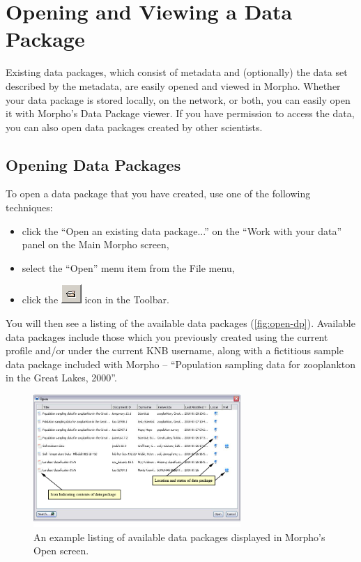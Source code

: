 \section{Opening and Viewing a Data Package} \label{sec:viewing}

Existing data packages, which consist of metadata and (optionally) the
data set described by the metadata, are easily opened and viewed in
Morpho. Whether your data package is stored locally, on the network, or
both, you can easily open it with Morpho's Data Package viewer. If you
have permission to access the data, you can also open data packages
created by other scientists. 

\subsection{Opening Data Packages}

To open a data package that you have created, use one of the following
techniques:

\begin{itemize}
  \setlength{\parskip}{1pt}
  \item click the ``Open an existing data package...'' on the ``Work
    with your data'' panel on the Main Morpho screen,
  \item select the ``Open'' menu item from the File menu,
  \item click the \includegraphics[scale=0.7]{images/button-open.png}
  icon in the Toolbar.
\end{itemize}

You will then see a listing of the available data packages
(\autoref{fig:open-dp}). Available data packages include those which you
previously created using the current profile and/or under the current
KNB username, along with a fictitious sample data package included with
Morpho -- ``Population sampling data for zooplankton in the Great Lakes,
2000''.

\begin{figure}
  \centering
    \includegraphics[width=0.7\textwidth]{images/open-dp.jpg}
  \caption{An example listing of available data packages displayed in
    Morpho's Open screen.}
  \label{fig:open-dp}
\end{figure}

